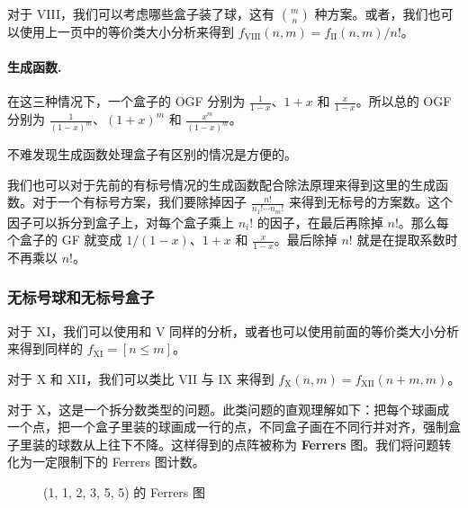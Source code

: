     对于 VIII，我们可以考虑哪些盒子装了球，这有 $\binom{m}{n}$ 种方案。或者，我们也可以使用上一页中的等价类大小分析来得到 $f_{\mathrm{VIII}}(n,m)=f_{\mathrm{II}}(n,m)/n!$。

    \paragraph{生成函数. }
    在这三种情况下，一个盒子的 OGF 分别为 $\frac{1}{1-x}$、$1+x$ 和 $\frac{x}{1-x}$。所以总的 OGF 分别为 $\frac{1}{(1-x)^m}$、$(1+x)^m$ 和 $\frac{x^m}{(1-x)^m}$。

    不难发现生成函数处理盒子有区别的情况是方便的。

    我们也可以对于先前的有标号情况的生成函数配合除法原理来得到这里的生成函数。对于一个有标号方案，我们要除掉因子 $\frac{n!}{n_1!\cdots n_m!}$ 来得到无标号的方案数。这个因子可以拆分到盒子上，对每个盒子乘上 $n_i!$ 的因子，在最后再除掉 $n!$。那么每个盒子的 GF 就变成 $1/(1-x)$、$1+x$ 和 $\frac{x}{1-x}$。最后除掉 $n!$ 就是在提取系数时不再乘以 $n!$。

\subsubsection{无标号球和无标号盒子}
    对于 XI，我们可以使用和 V 同样的分析，或者也可以使用前面的等价类大小分析来得到同样的 $f_{\mathrm{XI}}=[n\le m]$。

    对于 X 和 XII，我们可以类比 VII 与 IX 来得到 $f_{\mathrm{X}}(n,m)=f_{\mathrm{XII}}(n+m,m)$。

    对于 X，这是一个拆分数类型的问题。此类问题的直观理解如下：把每个球画成一个点，把一个盒子里装的球画成一行的点，不同盒子画在不同行并对齐，强制盒子里装的球数从上往下不降。这样得到的点阵被称为 \textbf{Ferrers} 图。我们将问题转化为一定限制下的 Ferrers 图计数。


    \begin{figure}[htbp]
        \centering
        \caption{(1, 1, 2, 3, 5, 5) 的 Ferrers 图}
    \end{figure}


